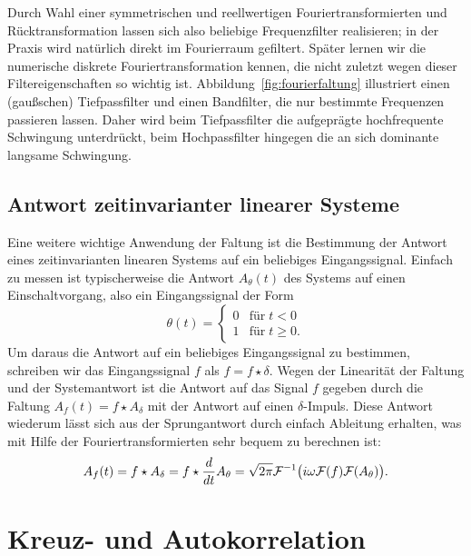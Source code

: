 Durch Wahl einer symmetrischen und reellwertigen
Fouriertransformierten und Rücktransformation lassen sich also
beliebige Frequenzfilter realisieren; in der Praxis wird natürlich
direkt im Fourierraum gefiltert. Später lernen wir die numerische
diskrete Fouriertransformation kennen, die nicht zuletzt wegen dieser
Filtereigenschaften so wichtig ist. Abbildung~\ref{fig:fourierfaltung}
illustriert einen (gaußschen) Tiefpassfilter und einen Bandfilter, die
nur bestimmte Frequenzen passieren lassen. Daher wird beim
Tiefpassfilter die aufgeprägte hochfrequente Schwingung unterdrückt,
beim Hochpassfilter hingegen die an sich dominante langsame
Schwingung.

\subsection{Antwort zeitinvarianter linearer Systeme}

Eine weitere wichtige Anwendung der Faltung ist die Bestimmung der
Antwort eines zeitinvarianten linearen Systems auf ein beliebiges
Eingangssignal. Einfach zu messen ist typischerweise die Antwort
$A_\theta(t)$ des Systems auf einen Einschaltvorgang, also ein
Eingangssignal der Form
\begin{equation}
  \theta(t) =
  \begin{cases}
    0 & \text{für}\; t < 0\\
    1 & \text{für}\; t \ge 0.
  \end{cases}
\end{equation}
Um daraus die Antwort auf ein beliebiges Eingangssignal zu bestimmen,
schreiben wir das Eingangssignal $f$ als $f = f \star \delta$. Wegen
der Linearität der Faltung und der Systemantwort ist die Antwort auf
das Signal $f$ gegeben durch die Faltung $A_f(t) = f \star A_\delta$
mit der Antwort auf einen $\delta$-Impuls. Diese Antwort wiederum
lässt sich aus der Sprungantwort durch einfach Ableitung erhalten, was
mit Hilfe der Fouriertransformierten sehr bequem zu berechnen ist:
\begin{equation}
  A_f(t) = f \star A_\delta = f \star
  \frac{d}{dt} A_\theta = \sqrt{2\pi} \mathcal F^{-1}\bigl( i\omega \mathcal F(f) \mathcal F(A_\theta)\bigr).
\end{equation}

\section{Kreuz- und Autokorrelation}

